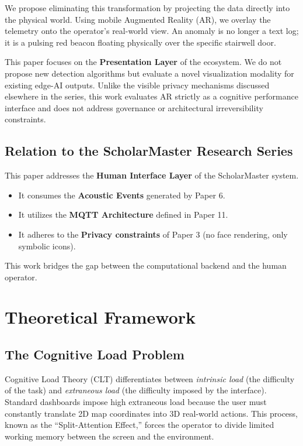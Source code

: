 \documentclass[conference]{IEEEtran}
\begin{document}
We propose eliminating this transformation by projecting the data directly into the physical world. Using mobile Augmented Reality (AR), we overlay the telemetry onto the operator's real-world view. An anomaly is no longer a text log; it is a pulsing red beacon floating physically over the specific stairwell door.

This paper focuses on the \textbf{Presentation Layer} of the ecosystem. We do not propose new detection algorithms but evaluate a novel visualization modality for existing edge-AI outputs. Unlike the visible privacy mechanisms discussed elsewhere in the series, this work evaluates AR strictly as a cognitive performance interface and does not address governance or architectural irreversibility constraints.

\subsection{Relation to the ScholarMaster Research Series}
This paper addresses the \textbf{Human Interface Layer} of the ScholarMaster system.
\begin{itemize}
    \item It consumes the \textbf{Acoustic Events} generated by Paper 6.
    \item It utilizes the \textbf{MQTT Architecture} defined in Paper 11.
    \item It adheres to the \textbf{Privacy constraints} of Paper 3 (no face rendering, only symbolic icons).
\end{itemize}
This work bridges the gap between the computational backend and the human operator.

\section{Theoretical Framework}

\subsection{The Cognitive Load Problem}
Cognitive Load Theory (CLT) differentiates between \textit{intrinsic load} (the difficulty of the task) and \textit{extraneous load} (the difficulty imposed by the interface). Standard dashboards impose high extraneous load because the user must constantly translate 2D map coordinates into 3D real-world actions. This process, known as the ``Split-Attention Effect,'' forces the operator to divide limited working memory between the screen and the environment.
\end{document}
